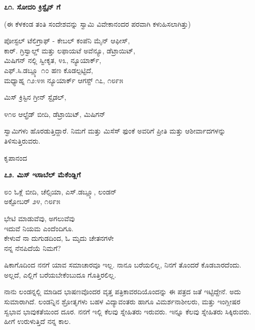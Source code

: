\begin{center}
\textbf{೭೧. ಸೋದರಿ ಕ್ರಿಸ್ಟೈನ್ ಗೆ}
\end{center}

\begin{center}
(ಈ ಕೆಳಕಂಡ ತಂತಿ ಸಂದೇಶವನ್ನು ಸ್ವಾಮಿ ವಿವೇಕಾನಂದರ ಪರವಾಗಿ ಕಳುಹಿಸಲಾಗಿತ್ತು)
\end{center}

\begin{flushright}
ಪೋಸ್ಟಲ್ ಟೆಲಿಗ್ರಾಫ್ - ಕೇಬಲ್ ಕಂಪೆನಿ ಮೈನ್ ಆಫೀಸ್,\\ಕಾರ್. ಗ್ರಿಸ್ವಾಲ್ಡ್ ಮತ್ತು ಲಫಾಯಟೆ ಅವೆನ್ಯೂ, ಡೆಟ್ರಾಯಿಟ್,\\ಮಿಷಿಗನ್ ನಲ್ಲಿ ಸ್ವೀಕೃತ, ೪೩, ನ್ಯೂಯಾರ್ಕ್,\\ಎಫ್.ಸಿ.ಡಬ್ಲ್ಯೂ ೧೦ ಹಣ ಕೊಡಲ್ಪಟ್ಟಿದೆ,\\ಮಧ್ಯಾಹ್ನ ೧೨:೪೫ ನ್ಯೂಯಾರ್ಕ್ ಆಗಸ್ಟ್ ೧೭, ೧೮೯೫
\end{flushright}

ಮಿಸ್ ಕ್ರಿಸ್ಟಿನ ಗ್ರೀನ್ ಸ್ಟೈಡಲ್,

೪೧೮ ಆಲ್ಫ್ರೆಡ್ ಬೀದಿ, ಡೆಟ್ರಾಯಿಟ್, ಮಿಷಿಗನ್

ಸ್ವಾಮಿಗಳು ಹೊರಡುತ್ತಿದ್ದಾರೆ. ನಿಮಗೆ ಮತ್ತು ಮಿಸೆಸ್ ಫುಂಕೆ ಅವರಿಗೆ ಪ್ರೀತಿ ಮತ್ತು ಆಶೀರ್ವಾದಗಳನ್ನು ತಿಳಿಸುತ್ತಿರುವರು.

\begin{flushright}
ಕೃಪಾನಂದ
\end{flushright}

\begin{center}
\textbf{೭೨. ಮಿಸ್ ಇಸಾಬೆಲ್ ಮೆಕೆಂಡ್ಲಿಗೆ}
\end{center}

\begin{flushright}
೮೦ ಓಕ್ಲೆ ಬೀದಿ, ಚೆಲ್ಸಿಯಾ, ಎಸ್.ಡಬ್ಲ್ಯೂ, ಲಂಡನ್\\ಅಕ್ಟೋಬರ್ ೨೪, ೧೮೯೫
\end{flushright}

\begin{myquote}
ಭೇಟಿ ಮಾಡುವೆವು, ಅಗಲುವೆವು\\ಇದುವೆ ನಿಯಮ ಎಂದೆಂದಿಗೂ.\\ಕೇಳುವೆ ನಾ ದುಗುಡದಿಂದ, ಓ ಮೃದು ಚೇತನಗಳೇ\\ನನ್ನ ನೆನಪಿದೆಯೆ ನಿಮಗೆ?
\end{myquote}

ಷಿಕಾಗೊದಿಂದ ನನಗೆ ಯಾವ ಸಮಾಚಾರವೂ ಇಲ್ಲ. ನಾನೂ ಬರೆಯಲಿಲ್ಲ, ನಿನಗೆ ತೊಂದರೆ ಕೊಡಬಾರದೆಂದು. ಅಲ್ಲದೆ, ಎಲ್ಲಿಗೆ ಬರೆಯಬೇಕೆಂಬುದೂ ಗೊತ್ತಿರಲಿಲ್ಲ.

ನಾನು ಲಂಡನ್ನಲ್ಲಿ ಮಾಡಿದ ಭಾಷಣವೊಂದರ ವೃತ್ತ ಪತ್ರಿಕಾವರದಿಯೊಂದನ್ನು ಈ ಪತ್ರದ ಜತೆ ಇಟ್ಟಿದ್ದೇನೆ. ಅದು ಸುಮಾರಾಗಿದೆ. ಲಂಡನ್ನಿನ ಶ್ರೋತೃಗಳು ಬಹಳ ವಿದ್ಯಾವಂತರು ಹಾಗೂ ವಿಮರ್ಶನಾಶೀಲರು, ಮತ್ತು ಇಂಗ್ಲೀಷರ ಸ್ವಭಾವ ಭಾವುಕತೆಯಿಂದ ದೂರ. ನನಗೆ ಇಲ್ಲಿ ಕೆಲವು ಸ್ನೇಹಿತರು ಇರುವರು. ಇನ್ನೂ ಕೆಲವು ಸ್ನೇಹಿತರು ಸಿಕ್ಕಿರುವರು. ಹೀಗೆ ಉರುಳುತ್ತಿದೆ ನನ್ನ ಕಾಲ.

